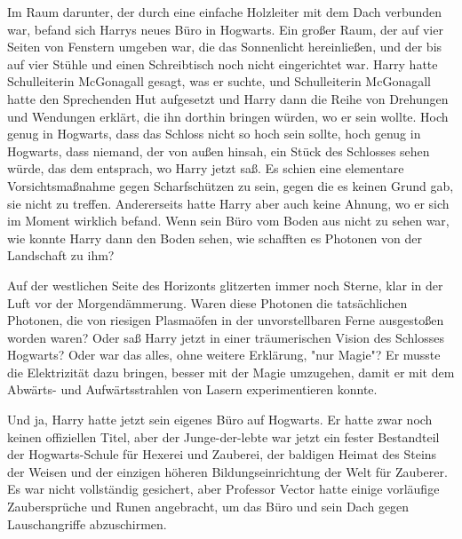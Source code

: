 {Im Raum darunter, der durch eine einfache Holzleiter mit dem Dach verbunden war, befand sich Harrys neues Büro in Hogwarts. Ein großer Raum, der auf vier Seiten von Fenstern umgeben war, die das Sonnenlicht hereinließen, und der bis auf vier Stühle und einen Schreibtisch noch nicht eingerichtet war. Harry hatte Schulleiterin McGonagall gesagt, was er suchte, und Schulleiterin McGonagall hatte den Sprechenden Hut aufgesetzt und Harry dann die Reihe von Drehungen und Wendungen erklärt, die ihn dorthin bringen würden, wo er sein wollte. Hoch genug in Hogwarts, dass das Schloss nicht so hoch sein sollte, hoch genug in Hogwarts, dass niemand, der von außen hinsah, ein Stück des Schlosses sehen würde, das dem entsprach, wo Harry jetzt saß. Es schien eine elementare Vorsichtsmaßnahme gegen Scharfschützen zu sein, gegen die es keinen Grund gab, sie nicht zu treffen. Andererseits hatte Harry aber auch keine Ahnung, wo er sich im Moment wirklich befand. Wenn sein Büro vom Boden aus nicht zu sehen war, wie konnte Harry dann den Boden sehen, wie schafften es Photonen von der Landschaft zu ihm?

Auf der westlichen Seite des Horizonts glitzerten immer noch Sterne, klar in der Luft vor der Morgendämmerung. Waren diese Photonen die tatsächlichen Photonen, die von riesigen Plasmaöfen in der unvorstellbaren Ferne ausgestoßen worden waren? Oder saß Harry jetzt in einer träumerischen Vision des Schlosses Hogwarts? Oder war das alles, ohne weitere Erklärung, "nur Magie"? Er musste die Elektrizität dazu bringen, besser mit der Magie umzugehen, damit er mit dem Abwärts- und Aufwärtsstrahlen von Lasern experimentieren konnte.

Und ja, Harry hatte jetzt sein eigenes Büro auf Hogwarts. Er hatte zwar noch keinen offiziellen Titel, aber der Junge-der-lebte war jetzt ein fester Bestandteil der Hogwarts-Schule für Hexerei und Zauberei, der baldigen Heimat des Steins der Weisen und der einzigen höheren Bildungseinrichtung der Welt für Zauberer. Es war nicht vollständig gesichert, aber Professor Vector hatte einige vorläufige Zaubersprüche und Runen angebracht, um das Büro und sein Dach gegen Lauschangriffe abzuschirmen.

}
